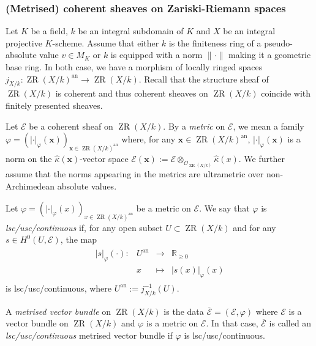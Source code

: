 \documentclass [11pt,reqno]{amsart}
\def\bR{{\mathbb{R}}}
\newcommand{\1}{\mathmybb{1}}
\def\cE{{\mathcal{E}}}
\def\cO{{\mathcal{O}}}
\def\an{\operatorname{an}}
\def\ZR{\operatorname{ZR}}
\newcommand{\fonction}[5]{\begin{array}{l|rcl}
#1: & #2 & \longrightarrow & #3 \\
    & #4 & \longmapsto & #5 \end{array}}
\begin{document}
\subsubsection{(Metrised) coherent sheaves on Zariski-Riemann spaces}
\label{subsub:metrised_vector_bundle_ZR_space}

Let $K$ be a field, $k$ be an integral subdomain of $K$ and $X$ be an integral projective $K$-scheme. Assume that either $k$ is the finiteness ring of a pseudo-absolute value $v\in M_{K}$ or $k$ is equipped with a norm $\|\cdot\|$ making it a geometric base ring. In both case, we have a morphism of locally ringed spaces $j_{X/k} : \ZR(X/k)^{\an}\to \ZR(X/k)$. Recall that the structure sheaf of $\ZR(X/k)$ is coherent and thus coherent sheaves on $\ZR(X/k)$ coincide with finitely presented sheaves.

Let $\cE$ be a coherent sheaf on $\ZR(X/k)$. By a \emph{metric} on $\cE$, we mean a family $\varphi=(|\cdot|_{\varphi}(\mathbf{x}))_{\mathbf{x}\in \ZR(X/k)^{\an}}$ where, for any $\mathbf{x}\in \ZR(X/k)^{\an}$, $|\cdot|_{\varphi}(\mathbf{x})$ is a norm on the $\widehat{\kappa}(\mathbf{x})$-vector space $\cE(\mathbf{x}):=\cE\otimes_{\cO_{\ZR(X/k)}} \widehat{\kappa}(x)$. We further assume that the norms appearing in the metrics are ultrametric over non-Archimedean absolute values.

Let $\varphi=(|\cdot|_{\varphi}(x))_{x\in \ZR(X/k)^{\an}}$ be a metric on $\cE$. We say that $\varphi$ is \emph{lsc/usc/continuous} if, for any open subset $U\subset \ZR(X/k)$ and for any $s\in H^{0}(U,\cE)$, the map
\begin{align*}
\fonction{|s|_{\varphi}(\cdot)}{U^{\an}}{\bR_{\geq 0}}{x}{|s(x)|_{\varphi}(x)}
\end{align*}
is lsc/usc/continuous, where $U^{\an}:=j_{X/k}^{-1}(U)$.

\begin{definition}
\label{def:metrised_vector_bundle_Zariski-Riemann}
A \emph{metrised vector bundle} on $\ZR(X/k)$ is the data $\overline{\cE}=(\cE,\varphi)$ where $\cE$ is a vector bundle on $\ZR(X/k)$ and $\varphi$ is a metric on $\cE$. In that case, $\overline{\cE}$ is called an \emph{lsc/usc/continuous} metrised vector bundle if $\varphi$ is lsc/usc/continuous.
\end{definition} 
\end{document}
